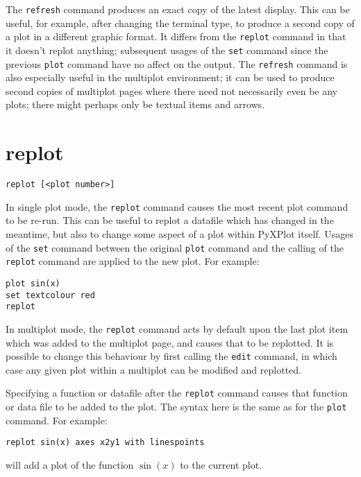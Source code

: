 \documentclass[a4paper,onecolumn,11pt]{book}
\begin{document}
The {\tt refresh} command produces an exact copy of the latest display. This can
be useful, for example, after changing the terminal type, to produce a second
copy of a plot in a different graphic format. It differs from the {\tt replot}
command in that it doesn't replot anything; subsequent usages of the {\tt set}
command since the previous {\tt plot} command have no affect on the output. The
{\tt refresh} command is also especially useful in the multiplot environment; it
can be used to produce second copies of multiplot pages where there need not
necessarily even be any plots; there might perhaps only be textual items and
arrows.


\section{replot}

\begin{verbatim}
replot [<plot number>]
\end{verbatim}

In single plot mode, the {\tt replot} command causes the most recent plot
command to be re-run.  This can be useful to replot a datafile which has changed
in the meantime, but also to change some aspect of a plot within PyXPlot itself.
Usages of the {\tt set} command between the original {\tt plot} command and the
calling of the {\tt replot} command are applied to the new plot. For example:

\begin{verbatim}
plot sin(x)
set textcolour red
replot
\end{verbatim}

In multiplot mode, the {\tt replot} command acts by default upon the last plot
item which was added to the multiplot page, and causes that to be replotted. It
is possible to change this behaviour by first calling the {\tt edit} command, in
which case any given plot within a multiplot can be modified and replotted.

Specifying a function or datafile after the {\tt replot} command causes that
function or data file to be added to the plot. The syntax here is the same as
for the {\tt plot} command.  For example:

\begin{verbatim}
replot sin(x) axes x2y1 with linespoints
\end{verbatim}

will add a plot of the function $\sin(x)$ to the current plot.
\end{document}
